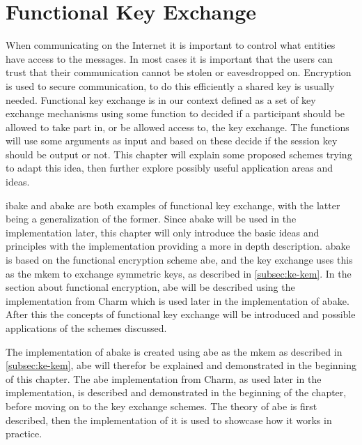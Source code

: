 \chapter{Functional Key Exchange}\label{chp:funckeyenc} 
When communicating on the Internet it is important to control what entities have access to the messages. In most cases it is important that the users can trust that their communication cannot be stolen or eavesdropped on. Encryption is used to secure communication, to do this efficiently a shared key is usually needed. Functional key exchange is in our context defined as a set of key exchange mechanisms using some function to decided if a participant should be allowed to take part in, or be allowed access to, the key exchange. The functions will use some arguments as input and based on these decide if the session key should be output or not. This chapter will explain some proposed schemes trying to adapt this idea, then further explore possibly useful application areas and ideas. 
\par \Gls{ibake} and \gls{abake} are both examples of functional key exchange, with the latter being a generalization of the former. Since \gls{abake} will be used in the implementation later, this chapter will only introduce the basic ideas and principles with the implementation providing a more in depth description.
\Gls{abake} is based on the functional encryption scheme \gls{abe}, and the key exchange uses this as the m\Gls{kem} to exchange symmetric keys, as described in \ref{subsec:ke-kem}. In the section about functional encryption, \gls{abe} will be described using the implementation from Charm which is used later in the implementation of \gls{abake}. After this the concepts of functional key exchange will be introduced and possible applications of the schemes discussed. 

 The implementation of \gls{abake} is created using \gls{abe} as the m\gls{kem} as described in \ref{subsec:ke-kem}, \gls{abe} will therefor be explained and demonstrated in the beginning of this chapter. The \gls{abe} implementation from Charm, as used later in the implementation, is described and demonstrated in the beginning of the chapter, before moving on to the key exchange schemes. The theory of \gls{abe} is first described, then the implementation of it is used to showcase how it works in practice. 



